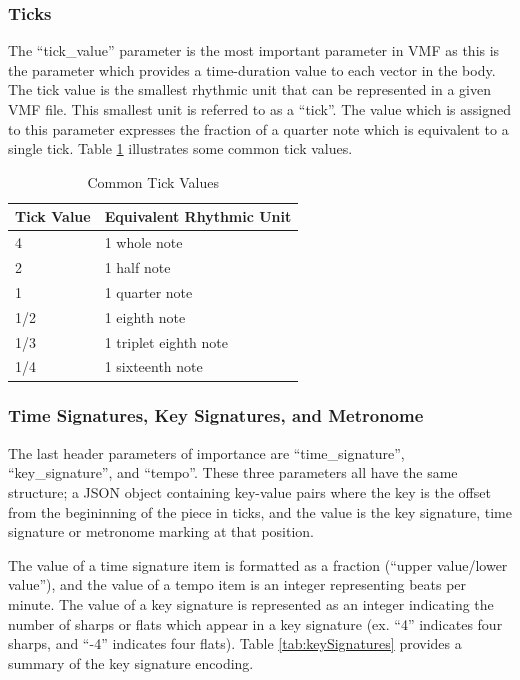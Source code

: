 \subsubsection{Ticks}

The ``tick\_value'' parameter is the most important parameter in VMF as this is the parameter which provides a time-duration value to each vector in the body. The tick value is the smallest rhythmic unit that can be represented in a given VMF file. This smallest unit is referred to as a ``tick''. The value which is assigned to this parameter expresses the fraction of a quarter note which is equivalent to a single tick. Table \ref{tab:tickValues} illustrates some common tick values.

\begin{table}[ht]
  \centering
  \begin{tabular}{ll}
  Tick Value & Equivalent Rhythmic Unit \\ \hline
  4          & 1 whole note             \\
  2          & 1 half note              \\
  1          & 1 quarter note           \\
  1/2        & 1 eighth note            \\
  1/3        & 1 triplet eighth note    \\
  1/4        & 1 sixteenth note        
  \end{tabular}
  \caption{Common Tick Values}
  \label{tab:tickValues}
\end{table}

\subsubsection{Time Signatures, Key Signatures, and Metronome}

The last header parameters of importance are ``time\_signature'', ``key\_signature'', and ``tempo''. These three parameters all have the same structure; a JSON object containing key-value pairs where the key is the offset from the begininning of the piece in ticks, and the value is the key signature, time signature or metronome marking at that position.

The value of a time signature item is formatted as a fraction (``upper value/lower value''), and the value of a tempo item is an integer representing beats per minute. The value of a key signature is represented as an integer indicating the number of sharps or flats which appear in a key signature (ex. ``4'' indicates four sharps, and ``-4'' indicates four flats). Table \ref{tab:keySignatures} provides a summary of the key signature encoding.

